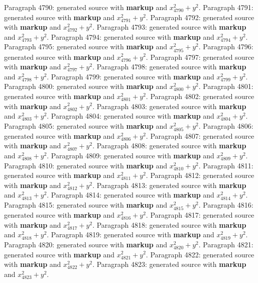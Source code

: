 \documentclass{article}
\begin{document}
Paragraph 4790: generated source with \textbf{markup} and $x_{4790}^2 + y^2$.
Paragraph 4791: generated source with \textbf{markup} and $x_{4791}^2 + y^2$.
Paragraph 4792: generated source with \textbf{markup} and $x_{4792}^2 + y^2$.
Paragraph 4793: generated source with \textbf{markup} and $x_{4793}^2 + y^2$.
Paragraph 4794: generated source with \textbf{markup} and $x_{4794}^2 + y^2$.
Paragraph 4795: generated source with \textbf{markup} and $x_{4795}^2 + y^2$.
Paragraph 4796: generated source with \textbf{markup} and $x_{4796}^2 + y^2$.
Paragraph 4797: generated source with \textbf{markup} and $x_{4797}^2 + y^2$.
Paragraph 4798: generated source with \textbf{markup} and $x_{4798}^2 + y^2$.
Paragraph 4799: generated source with \textbf{markup} and $x_{4799}^2 + y^2$.
Paragraph 4800: generated source with \textbf{markup} and $x_{4800}^2 + y^2$.
Paragraph 4801: generated source with \textbf{markup} and $x_{4801}^2 + y^2$.
Paragraph 4802: generated source with \textbf{markup} and $x_{4802}^2 + y^2$.
Paragraph 4803: generated source with \textbf{markup} and $x_{4803}^2 + y^2$.
Paragraph 4804: generated source with \textbf{markup} and $x_{4804}^2 + y^2$.
Paragraph 4805: generated source with \textbf{markup} and $x_{4805}^2 + y^2$.
Paragraph 4806: generated source with \textbf{markup} and $x_{4806}^2 + y^2$.
Paragraph 4807: generated source with \textbf{markup} and $x_{4807}^2 + y^2$.
Paragraph 4808: generated source with \textbf{markup} and $x_{4808}^2 + y^2$.
Paragraph 4809: generated source with \textbf{markup} and $x_{4809}^2 + y^2$.
Paragraph 4810: generated source with \textbf{markup} and $x_{4810}^2 + y^2$.
Paragraph 4811: generated source with \textbf{markup} and $x_{4811}^2 + y^2$.
Paragraph 4812: generated source with \textbf{markup} and $x_{4812}^2 + y^2$.
Paragraph 4813: generated source with \textbf{markup} and $x_{4813}^2 + y^2$.
Paragraph 4814: generated source with \textbf{markup} and $x_{4814}^2 + y^2$.
Paragraph 4815: generated source with \textbf{markup} and $x_{4815}^2 + y^2$.
Paragraph 4816: generated source with \textbf{markup} and $x_{4816}^2 + y^2$.
Paragraph 4817: generated source with \textbf{markup} and $x_{4817}^2 + y^2$.
Paragraph 4818: generated source with \textbf{markup} and $x_{4818}^2 + y^2$.
Paragraph 4819: generated source with \textbf{markup} and $x_{4819}^2 + y^2$.
Paragraph 4820: generated source with \textbf{markup} and $x_{4820}^2 + y^2$.
Paragraph 4821: generated source with \textbf{markup} and $x_{4821}^2 + y^2$.
Paragraph 4822: generated source with \textbf{markup} and $x_{4822}^2 + y^2$.
Paragraph 4823: generated source with \textbf{markup} and $x_{4823}^2 + y^2$.
\end{document}
